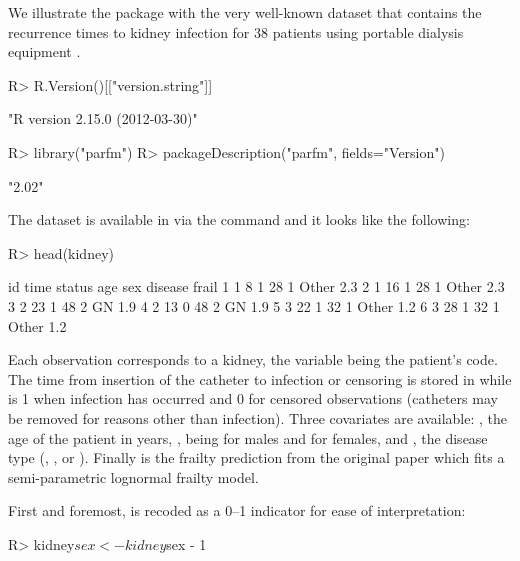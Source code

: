 We illustrate the  package with the very well-known  dataset 
  that contains the recurrence times to kidney infection for 38 patients using portable dialysis equipment \citep{McGilchristAisbett91}.
\begin{CodeChunk}
\begin{CodeInput}
R> R.Version()[["version.string"]]
\end{CodeInput}
\begin{CodeOutput}
[1] "R version 2.15.0 (2012-03-30)"
\end{CodeOutput}
\begin{CodeInput}
R> library("parfm")
R> packageDescription("parfm", fields="Version")
\end{CodeInput}
\begin{CodeOutput}
[1] "2.02"
\end{CodeOutput}
\end{CodeChunk}
The dataset is available in  via the command  and it looks like the following:
\begin{CodeChunk}
\begin{CodeInput}
R> head(kidney)
\end{CodeInput}
\begin{CodeOutput}
  id time status age sex disease frail
1  1    8      1  28   1   Other   2.3
2  1   16      1  28   1   Other   2.3
3  2   23      1  48   2      GN   1.9
4  2   13      0  48   2      GN   1.9
5  3   22      1  32   1   Other   1.2
6  3   28      1  32   1   Other   1.2
\end{CodeOutput}
\end{CodeChunk}

Each observation corresponds to a kidney, 
  the variable  being the patient's code.
The time from insertion of the catheter to infection or censoring is stored in 
  while  is 1 when infection has occurred and 0 for censored observations (catheters may be removed for reasons other than infection).
Three covariates are available: , the age of the patient in years,
  , being  for males and  for females,
  and , the disease type
  (, ,  or ).
Finally  is the frailty prediction from the original paper which fits a semi-parametric lognormal frailty model.

First and foremost,  is recoded as a 0--1 indicator for ease of interpretation:
\begin{CodeChunk}
\begin{CodeInput}
R> kidney$sex <- kidney$sex - 1
\end{CodeInput}
\end{CodeChunk}

